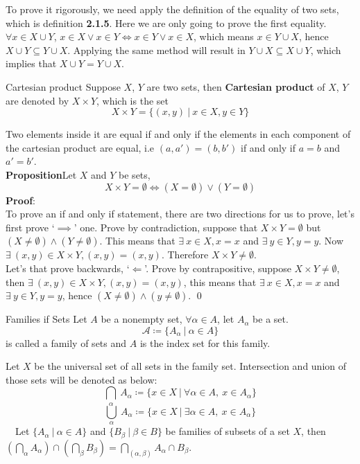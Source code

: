 \documentclass{article}
\begin{document}
To prove it rigorously, we need apply the definition of the equality of two sets, which is definition \textbf{2.1.5}.
Here we are only going to prove the first equality. $\forall x \in X \cup Y$, $x \in X \lor x \in Y \iff x \in Y \lor x \in X$, which means $x \in Y \cup X$, hence $X \cup Y \subseteq Y \cup X$. Applying the same method will result in $Y \cup X \subseteq X \cup Y$,
which implies that $X \cup Y = Y \cup X$.
\begin{defin}{Cartesian product}
    Suppose $X$, $Y$ are two sets, then \textbf{Cartesian product} of $X$, $Y$ are denoted by $X \times Y$,
    which is the set
    $$
    X \times Y = \{(x, y)\ |\ x\in X, y \in Y\}
    $$
\end{defin}
Two elements inside it are equal if and only if the elements in each component of the cartesian product are equal, i.e   $(a,a') = (b,b')$ if and only if $a = b$ and $a' = b'$.\\
\textbf{Proposition}\quad Let $X$ and $Y$ be sets,
$$X \times Y = \emptyset \iff (X = \emptyset) \lor (Y = \emptyset)$$
\textbf{Proof}:\\
To prove an if and only if statement, there are two directions for us to prove, let's first prove `$\implies$' one. Prove by contradiction,
suppose that $X \times Y = \emptyset$ but $(X \neq \emptyset) \land (Y \neq \emptyset)$. This means that $\exists\ x \in X, x = x$ and $\exists\ y \in Y, y = y$.
Now $\exists\ (x,y) \in X \times Y, (x, y) = (x, y)$. Therefore $X \times Y \neq \emptyset$.\\
Let's that prove backwards, `$\Longleftarrow$'. Prove by contrapositive, suppose $X \times Y \neq \emptyset$, then $\exists\ (x,y) \in X \times Y, (x, y) = (x, y)$, this means
that $\exists\ x \in X, x = x$ and $\exists\ y \in Y, y = y$, hence $(X \neq \emptyset) \land (y \neq \emptyset)$. \qed
\begin{defin}{Families if Sets}
    Let $A$ be a nonempty set, $\forall \alpha \in A$, let $A_{\alpha}$ be a set.
    $$
    \mathcal{A} \coloneqq \{A_{\alpha}\ |\ \alpha \in A \}
    $$
    is called a family of sets and $A$ is the index set for this family.
\end{defin}
Let $X$ be the universal set of all sets in the family set. Intersection and union of those sets will be denoted as below:
$$
\underset{\alpha}\bigcap\ A_{\alpha} \coloneqq \{x \in X \ |\ \forall \alpha \in A,\ x \in A_{\alpha} \}
$$
$$
\underset{\alpha}\bigcup\ A_{\alpha} \coloneqq \{x \in X\ |\ \exists \alpha \in A,\ x \in A_{\alpha}\}
$$
\quad\ \  Let $\{A_{\alpha}\ |\ \alpha \in A\}$ and $\{B_{\beta}\ |\ \beta \in B\}$ be families of subsets of a set $X$, then $ (\bigcap_{\alpha}A_{\alpha}) \cap ( \bigcap_{\beta} B_{\beta}) = \bigcap_{(\alpha, \beta)} A_{\alpha} \cap B_{\beta}$.\\
\end{document}
